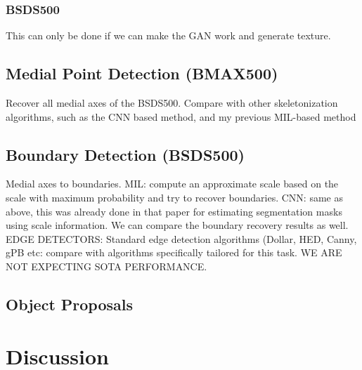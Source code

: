 \documentclass[10pt,twocolumn,letterpaper]{article}
\begin{document}
\subsubsection*{BSDS500}
This can only be done if we can make the GAN work and generate texture.

\subsection{Medial Point Detection (BMAX500)}\label{sec:medial-point-detection}
Recover all medial axes of the BSDS500. Compare with other skeletonization algorithms, such
as the CNN based method, and my previous MIL-based method

\subsection{Boundary Detection (BSDS500)}\label{sec:boundary-detection}
Medial axes to boundaries. 
MIL: compute an approximate scale based on the scale with maximum probability and try to recover boundaries.
CNN: same as above, this was already done in that paper for estimating segmentation masks using scale information.
We can compare the boundary recovery results as well.
EDGE DETECTORS: Standard edge detection algorithms (Dollar, HED, Canny, gPB etc: compare with algorithms specifically
tailored for this task. WE ARE NOT EXPECTING SOTA PERFORMANCE.

\subsection{Object Proposals}\label{sec:object-proposals}

\section{Discussion}\label{sec:discussion}

{\small


}
\end{document}
